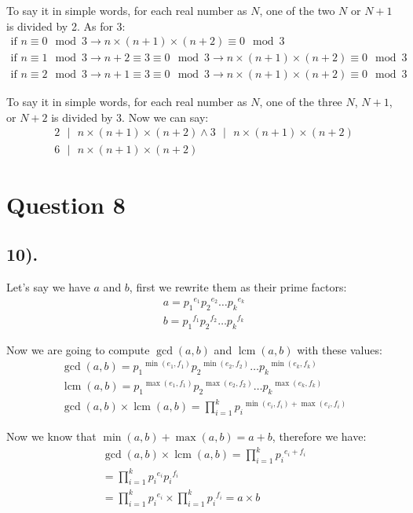 \documentclass[12pt]{article}
\begin{document}
To say it in simple words, for each real number as $N$, one of the two $N$ or $N+1$ is divided by 2. As for 3:
\begin{gather*}
    \text{if } n \equiv 0 \mod 3 \to n \times (n+1) \times (n+2) \equiv 0 \mod 3 \\
    \text{if } n \equiv 1 \mod 3 \to n+2 \equiv 3 \equiv 0 \mod 3 \to n \times (n+1) \times (n+2) \equiv 0 \mod 3 \\
    \text{if } n \equiv 2 \mod 3 \to n+1 \equiv 3 \equiv 0 \mod 3 \to n \times (n+1) \times (n+2) \equiv 0 \mod 3
\end{gather*}

To say it in simple words, for each real number as $N$, one of the three $N$, $N+1$, or $N+2$ is divided by 3. Now we can say:
\begin{gather*}
    2 \text{ $|$ } n \times (n+1) \times (n+2) \wedge 3 \text{ $|$ } n \times (n+1) \times (n+2) \\
    6 \text{ $|$ } n \times (n+1) \times (n+2)
\end{gather*}

\section*{Question 8}
\subsection*{10).}
Let's say we have $a$ and $b$, first we rewrite them as their prime factors:
\begin{gather*}
    a = {p_{1}}^{e_{1}} {p_{2}}^{e_{2}} \ldots {p_{k}}^{e_{k}} \\
    b = {p_{1}}^{f_{1}} {p_{2}}^{f_{2}} \ldots {p_{k}}^{f_{k}}
\end{gather*}

Now we are going to compute $\gcd(a, b)$ and $\operatorname{lcm}(a, b)$ with these values:
\begin{gather*}
    \gcd(a, b) = {p_{1}}^{\min(e_{1}, f_{1})} {p_{2}}^{\min(e_{2}, f_{2})} \ldots {p_{k}}^{\min(e_{k}, f_{k})} \\
    \operatorname{lcm}(a, b) = {p_{1}}^{\max(e_{1}, f_{1})} {p_{2}}^{\max(e_{2}, f_{2})} \ldots {p_{k}}^{\max(e_{k}, f_{k})} \\
    \gcd(a, b) \times \operatorname{lcm}(a, b) = \prod_{i=1}^{k} {p_{i}}^{\min(e_{i}, f_{i})+\max(e_{i}, f_{i})}
\end{gather*}

Now we know that $\min(a, b) + \max(a, b) = a+b$, therefore we have:
\begin{gather*}
    \gcd(a, b) \times \operatorname{lcm}(a, b) = \prod_{i=1}^{k} {p_{i}}^{e_{i} + f_{i}} \\
    = \prod_{i=1}^{k} {p_{i}}^{e_{i}} {p_{i}}^{f_{i}} \\
    = \prod_{i=1}^{k} {p_{i}}^{e_{i}} \times \prod_{i=1}^{k} {p_{i}}^{f_{i}} = a \times b
\end{gather*}
\end{document}
